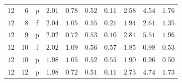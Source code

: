 \begin{tabular}{@{}rrcrrrrrrr@{}}
$12$ & $6$ & p & $2.01$ & $0.78$ & $0.52$ & $0.11$ & $2.58$ & $4.54$ & $1.76$ \\
$12$ & $8$ & f & $2.04$ & $1.05$ & $0.55$ & $0.21$ & $1.94$ & $2.61$ & $1.35$ \\
$12$ & $9$ & p & $2.02$ & $0.72$ & $0.53$ & $0.10$ & $2.81$ & $5.51$ & $1.96$ \\
$12$ & $10$ & f & $2.02$ & $1.09$ & $0.56$ & $0.57$ & $1.85$ & $0.98$ & $0.53$ \\
$12$ & $10$ & p & $1.98$ & $1.05$ & $0.52$ & $0.55$ & $1.90$ & $0.96$ & $0.50$ \\
$12$ & $12$ & p & $1.98$ & $0.72$ & $0.51$ & $0.11$ & $2.73$ & $4.74$ & $1.73$ \\
\bottomrule
\end{tabular}
